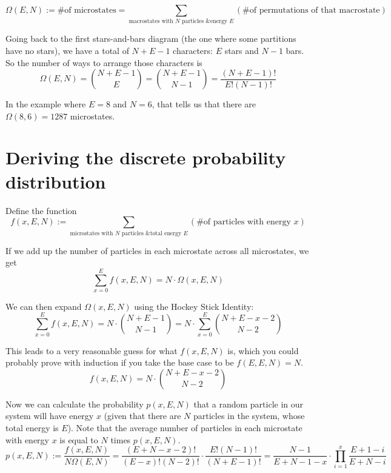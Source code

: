 \documentclass[12pt]{article}
\begin{document}
\[\Omega(E, N) := \text{\# of microstates} = \sum_{\text{macrostates with $N$ particles \& energy $E$}} (\text{\# of permutations of that macrostate})\]

Going back to the first stars-and-bars diagram (the one where some partitions have no stars), we have a total of $N+E-1$ characters: $E$ stars and $N-1$ bars. So the number of ways to arrange those characters is
\[\Omega(E, N) = {{N+E-1} \choose E} = {{N+E-1} \choose {N-1}} = \frac{(N+E-1)!}{E!(N-1)!} \]

In the example where $E=8$ and $N=6$, that tells us that there are $\Omega(8, 6) = 1287$ microstates.

\section{Deriving the discrete probability distribution}

Define the function
\[f(x, E, N) := \sum_{\text{microstates with $N$ particles \& total energy $E$}} (\text{\# of particles with energy $x$})\]

If we add up the number of particles in each microstate across all microstates, we get
\[\sum_{x=0}^E f(x, E, N) = N \cdot \Omega(x, E, N)\]

We can then expand $\Omega(x, E, N)$ using the Hockey Stick Identity:
\[\sum_{x=0}^E f(x, E, N) = N \cdot {{N+E-1} \choose {N-1}} = N \cdot \sum_{x=0}^E {{N+E-x-2} \choose {N-2}} \]

This leads to a very reasonable guess for what $f(x, E, N)$ is, which you could probably prove with induction if you take the base case to be $f(E,E,N) = N$.
\[f(x, E, N) = N \cdot {{N+E-x-2} \choose {N-2}}\]


Now we can calculate the probability $p(x, E, N)$ that a random particle in our system will have energy $x$ (given that there are $N$ particles in the system, whose total energy is $E$). Note that the average number of particles in each microstate with energy $x$ is equal to $N$ times $p(x, E, N)$.
\[p(x, E, N) := \frac{f(x, E, N)}{N \Omega(E, N)} = \frac{(E+N-x-2)!}{(E-x)!(N-2)!} \cdot \frac{E!(N-1)!}{(N+E-1)!} = \frac{N-1}{E+N-1-x} \cdot \prod_{i=1}^x \frac{E+1-i}{E+N-i} \]
\end{document}
